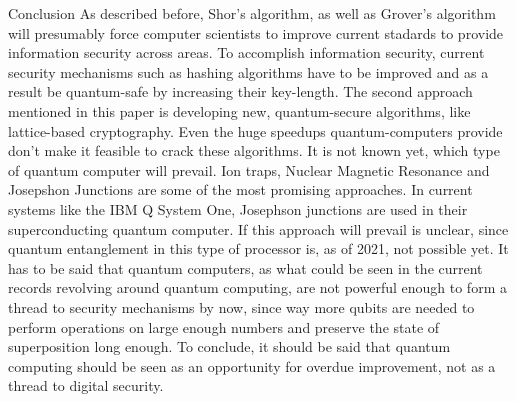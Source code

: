 \documentclass[aps,preprintnumbers,twocolumn]{revtex4}
\begin{document}
\begin{section}{Conclusion}
As described before, Shor's algorithm, 
as well as Grover's algorithm will presumably force computer scientists to improve current stadards to provide information security across areas. 
To accomplish information security, 
current security mechanisms such as hashing algorithms have to be improved and as a result be quantum-safe by increasing their key-length.
The second approach mentioned in this paper is developing new, 
quantum-secure algorithms, 
like lattice-based cryptography. 
Even the huge speedups quantum-computers provide don't make it feasible to crack these algorithms. 
It is not known yet, which type of quantum computer will prevail. 
Ion traps, Nuclear Magnetic Resonance and Josepshon Junctions are some of the most promising approaches. 
In current systems like the IBM Q System One, 
Josephson junctions are used in their superconducting quantum computer. 
If this approach will prevail is unclear, 
since quantum entanglement in this type of processor is, as of 2021, not possible yet. 
It has to be said that quantum computers, 
as what could be seen in the current records revolving around quantum computing, 
are not powerful enough to form a thread to security mechanisms by now, 
since way more qubits are needed to perform operations on large enough numbers and preserve the state of superposition long enough. 
To conclude, it should be said that quantum computing should be seen as an opportunity for overdue improvement, not as a thread to digital security. 
\end{section}



\end{document}
